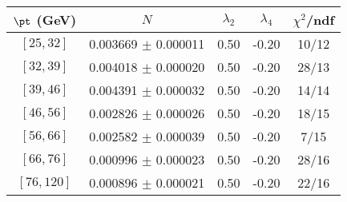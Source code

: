 \begin{tabular}{c||c|c|c|c}
$\pt$ (GeV) & $N$ & $\lambda_{2}$ & $\lambda_4$  & $\chi^2$/ndf  \\
\hline
$[25, 32]$ & 0.003669 $\pm$ 0.000011 & 0.50 & -0.20 & 10/12\\
$[32, 39]$ & 0.004018 $\pm$ 0.000020 & 0.50 & -0.20 & 28/13\\
$[39, 46]$ & 0.004391 $\pm$ 0.000032 & 0.50 & -0.20 & 14/14\\
$[46, 56]$ & 0.002826 $\pm$ 0.000026 & 0.50 & -0.20 & 18/15\\
$[56, 66]$ & 0.002582 $\pm$ 0.000039 & 0.50 & -0.20 & 7/15\\
$[66, 76]$ & 0.000996 $\pm$ 0.000023 & 0.50 & -0.20 & 28/16\\
$[76, 120]$ & 0.000896 $\pm$ 0.000021 & 0.50 & -0.20 & 22/16\\
\end{tabular}
